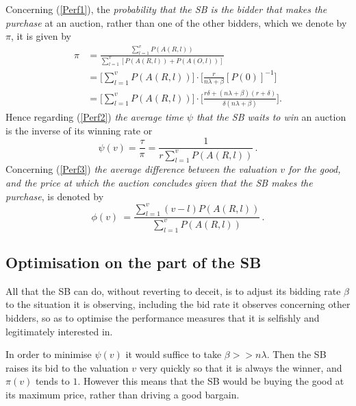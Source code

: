 \documentclass{comjnl}
\begin{document}
Concerning (\ref{Perf1}),  the {\em probability that the SB is the
bidder that makes the purchase} at an auction, rather than one of
the other bidders, which we denote by $\pi$, it is given by
\begin{align} \label{eq:pi_WinningProb}
\pi &=\frac{\sum_{l=1}^{v} P(A(R,l))}{\sum_{l=1}^{v}[P(A(R,l))+P(A(O,l))]} \\
&=\bigg[\sum_{l=1}^{v} P(A(R,l)) \bigg] \cdot \bigg[
\frac{r}{n\lambda+\beta} [P(0)]^{-1} \bigg] \nonumber \\
&=\bigg[\sum_{l=1}^{v} P(A(R,l))\bigg] \cdot \bigg[
\frac{r\delta+(n\lambda+\beta)(r+\delta)} {\delta(n\lambda+\beta)}
\bigg]. \nonumber
\end{align}
Hence regarding (\ref{Perf2}) {\em the average time $\psi$ that
the SB waits to win} an auction is the inverse of its winning rate
or
\begin{equation} \label{eq:FirstModel_ExpWaitToWin}
\psi(v)=\frac{\tau}{\pi}=\frac{1}{r\sum_{l=1}^{v}P(A(R,l))} \,.
\nonumber
\end{equation}
Concerning (\ref{Perf3}) {\em the average difference between the
valuation $v$ for the good, and the price at which the auction
concludes given that the SB makes the purchase}, is denoted by
\begin{equation} \phi(v)\ = \frac{ \sum_{l=1}^{v} (v-l) P(A(R,l))
}{ \sum_{l=1}^{v}P(A(R,l))} \,.
\end{equation}

\subsection{Optimisation on the part of the SB}

All that the SB can do, without reverting to deceit, is to adjust
its bidding rate $\beta$ to the situation it is observing,
including the bid rate it observes concerning other bidders, so as
to optimise the performance measures that it is selfishly and
legitimately interested in.

In order to minimise $\psi(v)$ it would suffice to take
$\beta>>n\lambda$. Then the SB raises its bid to the valuation $v$
very quickly so that it is always the winner, and $\pi(v)$ tends
to $1$. However this means that the SB would be buying the good at
its maximum price, rather than driving a good bargain.
\end{document}
